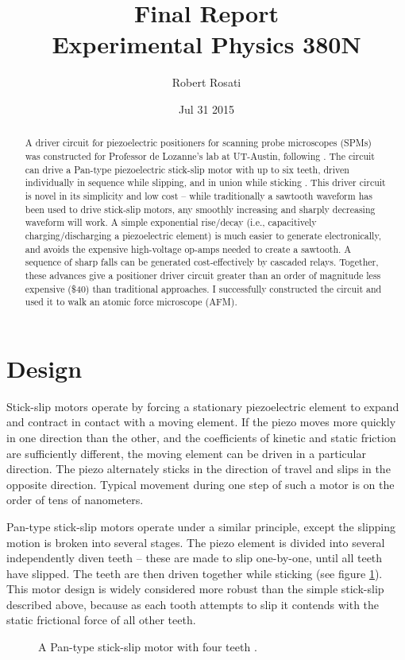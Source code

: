 \documentclass[12pt]{article}
\begin{document}
\singlespacing
\title{Final Report\\
Experimental Physics 380N}
\date{Jul 31 2015}
\author{Robert Rosati}
\maketitle

\begin{abstract}
\par A driver circuit for piezoelectric positioners for scanning probe microscopes (SPMs) was constructed for Professor de Lozanne's lab at UT-Austin, following \cite{Chen12}. The circuit can drive a Pan-type piezoelectric stick-slip motor with up to six teeth, driven individually in sequence while slipping, and in union while sticking \cite{Pan99}. This driver circuit is novel in its simplicity and low cost -- while traditionally a sawtooth waveform has been used to drive stick-slip motors, any smoothly increasing and sharply decreasing waveform will work. A simple exponential rise/decay (i.e., capacitively charging/discharging a piezoelectric element) is much easier to generate electronically, and avoids the expensive high-voltage op-amps needed to create a sawtooth. A sequence of sharp falls can be generated cost-effectively by cascaded relays. Together, these advances give a positioner driver circuit greater than an order of magnitude less expensive (\$40) than traditional approaches. I successfully constructed the circuit and used it to walk an atomic force microscope (AFM).
\end{abstract}

\doublespacing
\section{Design}
\par Stick-slip motors operate by forcing a stationary piezoelectric element to expand and contract in contact with a moving element. If the piezo moves more quickly in one direction than the other, and the coefficients of kinetic and static friction are sufficiently different, the moving element can be driven in a particular direction. The piezo alternately sticks in the direction of travel and slips in the opposite direction. Typical movement during one step of such a motor is on the order of tens of nanometers.
\par Pan-type stick-slip motors operate under a similar principle, except the slipping motion is broken into several stages. The piezo element is divided into several independently diven teeth -- these are made to slip one-by-one, until all teeth have slipped. The teeth are then driven together while sticking (see figure \ref{fig:panmotor}). This motor design is widely considered more robust than the simple stick-slip described above, because as each tooth attempts to slip it contends with the static frictional force of all other teeth.
\begin{figure}[ht]
\centering
\caption{A Pan-type stick-slip motor with four teeth \cite{Pan99}.}
\label{fig:panmotor}
\end{figure}
\end{document}
